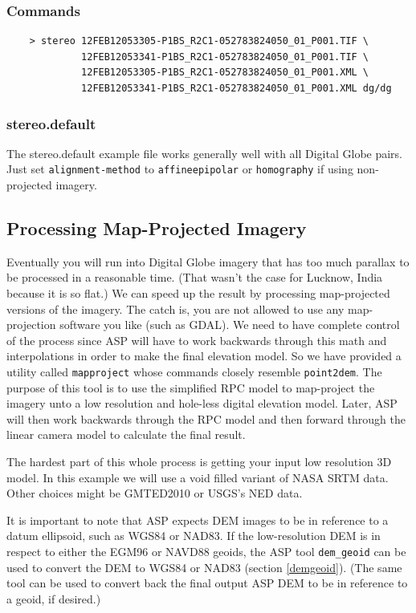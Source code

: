 \subsubsection*{Commands}

\begin{verbatim}
    > stereo 12FEB12053305-P1BS_R2C1-052783824050_01_P001.TIF \
             12FEB12053341-P1BS_R2C1-052783824050_01_P001.TIF \
             12FEB12053305-P1BS_R2C1-052783824050_01_P001.XML \
             12FEB12053341-P1BS_R2C1-052783824050_01_P001.XML dg/dg
\end{verbatim}

\subsubsection*{stereo.default}

The stereo.default example file works generally well with all Digital
Globe pairs. Just set \texttt{alignment-method} to
\texttt{affineepipolar} or \texttt{homography} if using non-projected
imagery.

\subsection{Processing Map-Projected Imagery}
\label{mapproj}

Eventually you will run into Digital Globe imagery that has too much
parallax to be processed in a reasonable time. (That wasn't the case
for Lucknow, India because it is so flat.) We can speed up the result
by processing map-projected versions of the imagery. The catch is, you
are not allowed to use any map-projection software you like (such as
GDAL). We need to have complete control of the process since ASP will
have to work backwards through this math and interpolations in order
to make the final elevation model. So we have provided a utility
called \texttt{mapproject} whose commands closely resemble
\texttt{point2dem}. The purpose of this tool is to use the simplified
RPC model to map-project the imagery unto a low resolution and
hole-less digital elevation model. Later, ASP will then work backwards
through the RPC model and then forward through the linear camera model
to calculate the final result.

The hardest part of this whole process is getting your input low
resolution 3D model. In this example we will use a void filled variant
of NASA SRTM data. Other choices might be GMTED2010 or USGS's NED
data.

It is important to note that ASP expects DEM images to be in
reference to a datum ellipsoid, such as WGS84 or NAD83. If the
low-resolution DEM is in respect to either the EGM96 or NAVD88 geoids,
the ASP tool \texttt{dem\_geoid} can be used to convert the DEM to WGS84
or NAD83 (section \ref{demgeoid}). (The same tool can be used to convert
back the final output ASP DEM to be in reference to a geoid, if
desired.)

